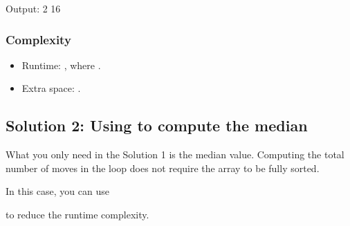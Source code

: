 \documentclass[letterpaper,12pt,english]{book}
\begin{document}
\begin{sphinxVerbatim}[commandchars=\\\{\}]
Output:
2
16
\end{sphinxVerbatim}


\subsubsection{Complexity}
\label{\detokenize{Mathematics/09_MTH_462_Minimum_Moves_to_Equal_Array_Elements_II:complexity}}\begin{itemize}
\item {} 
\sphinxAtStartPar
Runtime: , where .

\item {} 
\sphinxAtStartPar
Extra space: .

\end{itemize}


\subsection{Solution 2: Using  to compute the median}
\label{\detokenize{Mathematics/09_MTH_462_Minimum_Moves_to_Equal_Array_Elements_II:solution-2-using-std-nth-element-to-compute-the-median}}
\sphinxAtStartPar
What you only need in the Solution 1 is the median value. Computing the total number of moves in the  loop does not require the array  to be fully sorted.

\sphinxAtStartPar
In this case, you can use %
\begin{footnote}[131]\sphinxAtStartFootnote
{}
%
\end{footnote} to reduce the runtime complexity.
\end{document}

